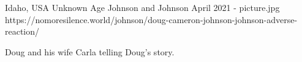 {Idaho, USA}
{Unknown Age}
{Johnson and Johnson}
{April 2021}
{-}
{picture.jpg}
{https://nomoresilence.world/johnson/doug-cameron-johnson-johnson-adverse-reaction/}
{


Doug and his wife Carla telling Doug’s story.
}
